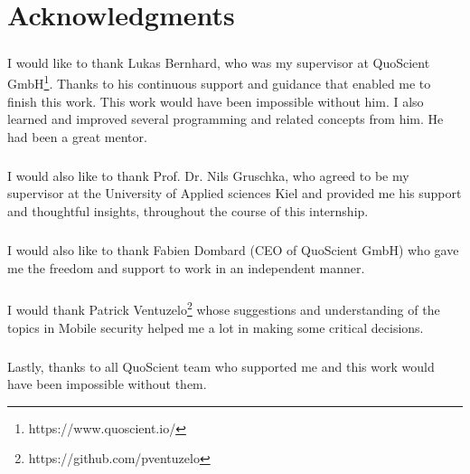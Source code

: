 \documentclass[../main.tex]{subfile}
\begin{document}
\chapter*{\centering Acknowledgments}

\paragraph{} I would like to thank Lukas Bernhard, who was my supervisor at QuoScient GmbH\footnote{https://www.quoscient.io/}. Thanks to his continuous support and guidance that enabled me to finish this work. This work would have been impossible without him. I also learned and improved several programming and related concepts from him. He had been a great mentor.

\paragraph{} I would also like to thank Prof. Dr. Nils Gruschka, who agreed to be my supervisor at the University of Applied sciences Kiel and provided me his support and thoughtful insights, throughout the course of this internship.

\paragraph{} I would also like to thank Fabien Dombard (CEO of QuoScient GmbH) who gave me the freedom and support to work in an independent manner.

\paragraph{} I would thank Patrick Ventuzelo\footnote{https://github.com/pventuzelo} whose suggestions and understanding of the topics in Mobile security helped me a lot in making some critical decisions.

\paragraph{} Lastly, thanks to all QuoScient team who supported me and this work would have been impossible without them.
\end{document}
